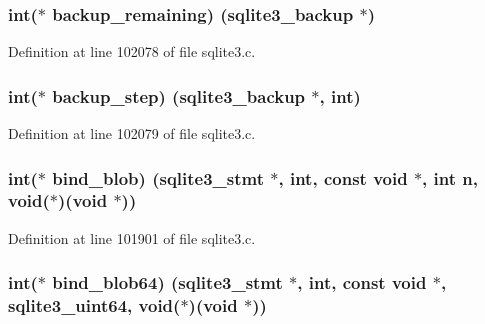 \subsubsection[{backup\+\_\+remaining}]{\setlength{\rightskip}{0pt plus 5cm}int($\ast$ backup\+\_\+remaining) ({\bf sqlite3\+\_\+backup} $\ast$)}\label{structsqlite3__api__routines_a25c20bd7dd623a812864631e51727f1c}


Definition at line 102078 of file sqlite3.\+c.

\hypertarget{structsqlite3__api__routines_acebca92abb5df03f4ad215f90697962c}{}
\subsubsection[{backup\+\_\+step}]{\setlength{\rightskip}{0pt plus 5cm}int($\ast$ backup\+\_\+step) ({\bf sqlite3\+\_\+backup} $\ast$, int)}\label{structsqlite3__api__routines_acebca92abb5df03f4ad215f90697962c}


Definition at line 102079 of file sqlite3.\+c.

\hypertarget{structsqlite3__api__routines_a330ba6acb16254aab7a1d7f5785727d0}{}
\subsubsection[{bind\+\_\+blob}]{\setlength{\rightskip}{0pt plus 5cm}int($\ast$ bind\+\_\+blob) ({\bf sqlite3\+\_\+stmt} $\ast$, int, const void $\ast$, int n, void($\ast$)(void $\ast$))}\label{structsqlite3__api__routines_a330ba6acb16254aab7a1d7f5785727d0}


Definition at line 101901 of file sqlite3.\+c.

\hypertarget{structsqlite3__api__routines_a6d21d0fa176db371fcd8e2353a9135ba}{}
\subsubsection[{bind\+\_\+blob64}]{\setlength{\rightskip}{0pt plus 5cm}int($\ast$ bind\+\_\+blob64) ({\bf sqlite3\+\_\+stmt} $\ast$, int, const void $\ast$, {\bf sqlite3\+\_\+uint64}, void($\ast$)(void $\ast$))}\label{structsqlite3__api__routines_a6d21d0fa176db371fcd8e2353a9135ba}


